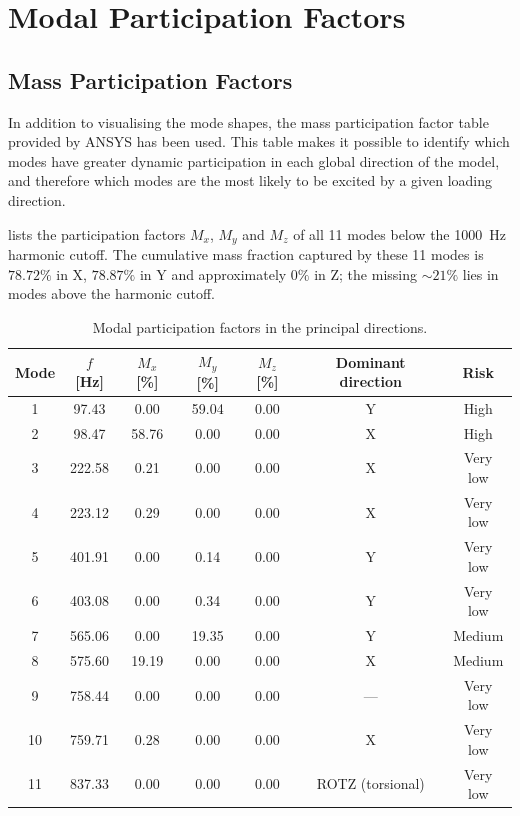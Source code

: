 \section{Modal Participation Factors}

\subsection{Mass Participation Factors}

In addition to visualising the mode shapes, the mass participation factor table provided by ANSYS has been used. This table makes it possible to identify which modes have greater dynamic participation in each global direction of the model, and therefore which modes are the most likely to be excited by a given loading direction.

 lists the participation factors $M_x$, $M_y$ and $M_z$ of all 11 modes below the \SI{1000}{\hertz} harmonic cutoff. The cumulative mass fraction captured by these 11 modes is $78.72\%$ in X, $78.87\%$ in Y and approximately $0\%$ in Z; the missing $\sim 21\%$ lies in modes above the harmonic cutoff.

\begin{table}[H]
\centering
\caption{Modal participation factors in the principal directions.}
\label{tab:modal_participation}
\small
\begin{tabular}{c c c c c c c}
\toprule
\multicolumn{1}{c}{Mode} & \multicolumn{1}{c}{$f$ [\si{\hertz}]} & \multicolumn{1}{c}{$M_x$ [\%]} & \multicolumn{1}{c}{$M_y$ [\%]} & \multicolumn{1}{c}{$M_z$ [\%]} & \multicolumn{1}{c}{Dominant direction} & \multicolumn{1}{c}{Risk} \\
\midrule
1  &  97.43  & 0.00  & 59.04 & 0.00  & Y                & High       \\
2  &  98.47  & 58.76 & 0.00  & 0.00  & X                & High       \\
3  & 222.58  & 0.21  & 0.00  & 0.00  & X                & Very low   \\
4  & 223.12  & 0.29  & 0.00  & 0.00  & X                & Very low   \\
5  & 401.91  & 0.00  & 0.14  & 0.00  & Y                & Very low   \\
6  & 403.08  & 0.00  & 0.34  & 0.00  & Y                & Very low   \\
7  & 565.06  & 0.00  & 19.35 & 0.00  & Y                & Medium     \\
8  & 575.60  & 19.19 & 0.00  & 0.00  & X                & Medium     \\
9  & 758.44  & 0.00  & 0.00  & 0.00  & ---              & Very low     \\
10 & 759.71  & 0.28  & 0.00  & 0.00  & X                & Very low   \\
11 & 837.33  & 0.00  & 0.00  & 0.00  & ROTZ (torsional) & Very low     \\
\bottomrule
\end{tabular}
\end{table}

